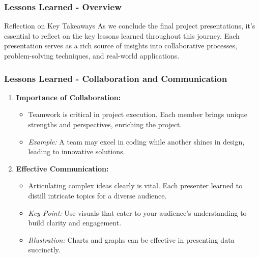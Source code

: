 \documentclass[aspectratio=169]{beamer}
\begin{document}
\begin{frame}[fragile]
  \frametitle{Lessons Learned - Overview}
  \begin{block}{Reflection on Key Takeaways}
    As we conclude the final project presentations, it's essential to reflect on the key lessons learned throughout this journey. Each presentation serves as a rich source of insights into collaborative processes, problem-solving techniques, and real-world applications.
  \end{block}
\end{frame}

\begin{frame}[fragile]
  \frametitle{Lessons Learned - Collaboration and Communication}
  \begin{enumerate}
    \item \textbf{Importance of Collaboration:} 
      \begin{itemize}
        \item Teamwork is critical in project execution. Each member brings unique strengths and perspectives, enriching the project.
        \item \textit{Example:} A team may excel in coding while another shines in design, leading to innovative solutions.
      \end{itemize}
    
    \item \textbf{Effective Communication:} 
      \begin{itemize}
        \item Articulating complex ideas clearly is vital. Each presenter learned to distill intricate topics for a diverse audience.
        \item \textit{Key Point:} Use visuals that cater to your audience’s understanding to build clarity and engagement.
        \item \textit{Illustration:} Charts and graphs can be effective in presenting data succinctly.
      \end{itemize}
  \end{enumerate}
\end{frame}
\end{document}
